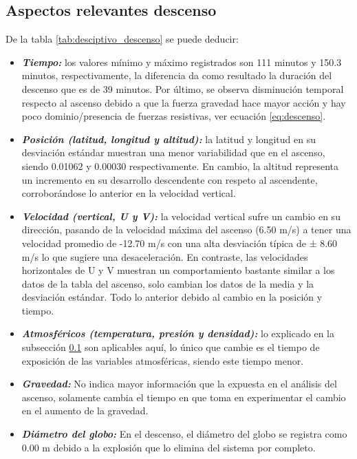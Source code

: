 \subsection{Aspectos relevantes descenso} \label{ssct:eda:aspectos_descenso} 

De la tabla \ref{tab:desciptivo_descenso} se puede deducir:
    
    \begin{itemize}

        \item \textbf{\textit{Tiempo:}} los valores mínimo y máximo registrados son 111 minutos y 150.3 minutos, respectivamente, la diferencia da como resultado la duración del descenso que es de 39 minutos. Por último, se observa disminución  temporal respecto al ascenso debido a que la fuerza gravedad hace mayor acción  y hay poco dominio/presencia de fuerzas resistivas, ver ecuación \ref{eq:descenso}.
        \item \textbf{\textit{Posición (latitud, longitud y altitud):}}  la latitud y longitud en su desviación estándar muestran una menor variabilidad que en el ascenso, siendo 0.01062 y 0.00030 respectivamente. En cambio, la altitud representa un incremento en su desarrollo descendente con respeto al ascendente, corroborándose lo anterior en la velocidad vertical.
        \item \textbf{\textit{Velocidad (vertical, U y V):}}  la velocidad vertical sufre un cambio en su dirección, pasando de la velocidad máxima del ascenso (6.50 m/s) a tener una velocidad promedio de -12.70 m/s con una alta desviación típica de ± 8.60 m/s lo que sugiere una desaceleración. En contraste, las velocidades horizontales de U y V muestran un comportamiento bastante similar a los datos de la tabla del ascenso, solo cambian los datos de la media y la desviación estándar.  Todo lo anterior debido al cambio en la posición y tiempo.
        \item \textbf{\textit{Atmosféricos  (temperatura, presión y densidad):}}  lo explicado en la subsección \ref{ssct:eda:aspectos_descenso} son aplicables aquí, lo único que cambie es el tiempo de exposición de las variables atmosféricas, siendo este tiempo menor. 
        \item \textbf{\textit{Gravedad:}}  No indica mayor información que la expuesta en el análisis del ascenso, solamente cambia el tiempo en que toma en experimentar el cambio en el aumento de la gravedad.
        \item \textbf{\textit{Diámetro del globo:}}  En el descenso, el diámetro del globo se registra como 0.00 m debido a la explosión que lo elimina del sistema por completo.
    \end{itemize}
        

